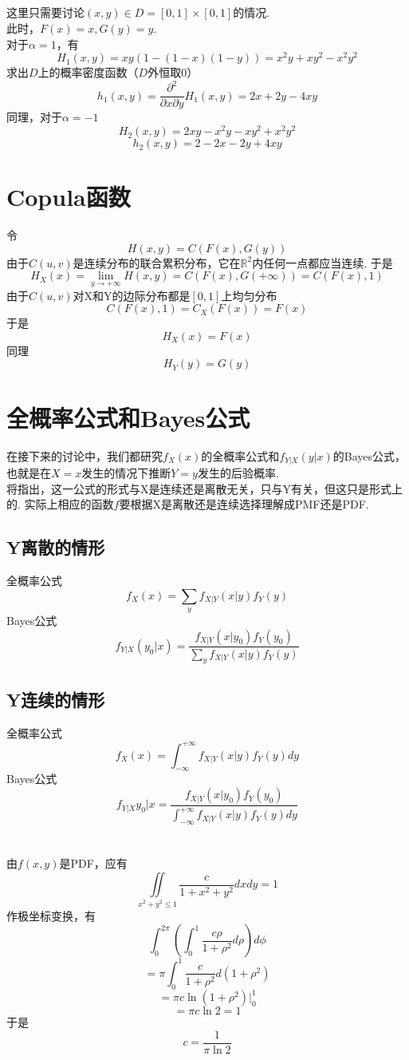 \documentclass{article}
\begin{document}
\begin{CJK}{UTF8}{gbsn}
\subsection{}
这里只需要讨论$(x,y)\in D=[0,1]\times[0,1]$的情况.
\\此时，$F(x)=x,G(y)=y$.
\\对于$\alpha=1$，有
$$ H_{1}(x,y)=xy(1-(1-x)(1-y))=x^{2}y+xy^{2}-x^{2}y^{2}$$
求出$D$上的概率密度函数（$D$外恒取0）
$$ h_{1}(x,y)=\frac{\partial^{2}}{\partial x\partial y}H_{1}(x,y)=2x+2y-4xy$$
同理，对于$\alpha=-1$
$$ H_{2}(x,y)=2xy-x^{2}y-xy^{2}+x^{2}y^{2}$$
$$ h_{2}(x,y)=2-2x-2y+4xy$$
\section{Copula函数}
令
$$ H(x,y)=C(F(x),G(y))$$
由于$C(u,v)$是连续分布的联合累积分布，它在$\mathbb{R}^{2}$内任何一点都应当连续.
于是
$$ H_{X}(x)=\lim\limits_{y\to+\infty}H(x,y)=C(F(x),G(+\infty))=C(F(x),1)$$
由于$C(u,v)$对X和Y的边际分布都是$[0,1]$上均匀分布
$$ C(F(x),1)=C_{X}(F(x))=F(x) $$
于是
$$ H_{X}(x)=F(x)$$
同理
$$ H_{Y}(y)=G(y)$$
\section{全概率公式和Bayes公式}
在接下来的讨论中，我们都研究$f_{X}(x)$的全概率公式和$f_{Y|X}(y|x)$的Bayes公式，也就是在$X=x$发生的情况下推断$Y=y$发生的后验概率.
\\将指出，这一公式的形式与X是连续还是离散无关，只与Y有关，但这只是形式上的. 实际上相应的函数$f$要根据X是离散还是连续选择理解成PMF还是PDF.
\subsection{Y离散的情形}
全概率公式
$$ f_{X}(x)=\sum\limits_{y}f_{X|Y}(x|y)f_{Y}(y) $$
Bayes公式
$$ f_{Y|X}(y_{0}|x)=\frac{f_{X|Y}(x|y_{0})f_{Y}(y_{0})}{\sum\limits_{y}f_{X|Y}(x|y)f_{Y}(y)}$$
\subsection{Y连续的情形}
全概率公式
$$ f_{X}(x)=\int_{-\infty}^{+\infty}f_{X|Y}(x|y)f_{Y}(y)dy $$
Bayes公式
$$ f_{Y|X}{y_{0}|x}=\frac{f_{X|Y}(x|y_{0})f_{Y}(y_{0})}{\int_{-\infty}^{+\infty}f_{X|Y}(x|y)f_{Y}(y)dy}$$
\section{}
\subsection{}
由$f(x,y)$是PDF，应有
$$ \iint\limits_{x^{2}+y^{2}\leq 1}\frac{c}{1+x^{2}+y^{2}}dxdy = 1$$
作极坐标变换，有
$$ \int_{0}^{2\pi}(\int_{0}^{1}\frac{c\rho}{1+\rho^{2}}d\rho)d\phi $$
$$ =\pi\int_{0}^{1}\frac{c}{1+\rho^{2}}d(1+\rho^{2})$$
$$ =\pi c\ln(1+\rho^{2})|_{0}^{1}$$
$$ =\pi c\ln 2=1 $$
于是
$$ c=\frac{1}{\pi\ln2}$$

\end{CJK}
\end{document}

